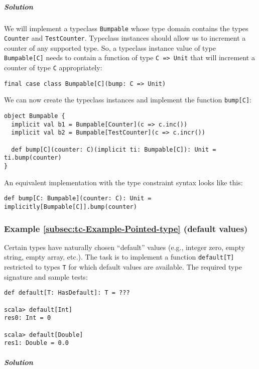 \subparagraph{Solution}

We will implement a typeclass \lstinline!Bumpable! whose type domain
contains the types \lstinline!Counter! and \lstinline!TestCounter!.
Typeclass instances should allow us to increment a counter of any
supported type. So, a typeclass instance value of type \lstinline!Bumpable[C]!
needs to contain a function of type \lstinline!C => Unit! that will
increment a counter of type \lstinline!C! appropriately:
\begin{lstlisting}
final case class Bumpable[C](bump: C => Unit)
\end{lstlisting}
We can now create the typeclass instances and implement the function
\lstinline!bump[C]!:
\begin{lstlisting}
object Bumpable {
  implicit val b1 = Bumpable[Counter](c => c.inc())
  implicit val b2 = Bumpable[TestCounter](c => c.incr())
  
  def bump[C](counter: C)(implicit ti: Bumpable[C]): Unit = ti.bump(counter)
}
\end{lstlisting}
An equivalent implementation with the type constraint syntax looks
like this:
\begin{lstlisting}
def bump[C: Bumpable](counter: C): Unit = implicitly[Bumpable[C]].bump(counter)
\end{lstlisting}


\subsubsection{Example \label{subsec:tc-Example-Pointed-type}\ref{subsec:tc-Example-Pointed-type}
(default values)}

Certain types have naturally chosen \textsf{``}default\textsf{''} values (e.g., integer
zero, empty string, empty array, etc.). The task is to implement a
function \lstinline!default[T]! restricted to types \lstinline!T!
for which default values are available. The required type signature
and sample tests:
\begin{lstlisting}
def default[T: HasDefault]: T = ???

scala> default[Int]
res0: Int = 0

scala> default[Double]
res1: Double = 0.0
\end{lstlisting}


\subparagraph{Solution}

